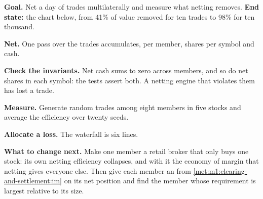 \begin{tutorial}
\textbf{Goal.} Net a day of trades multilaterally and measure what netting
removes. \textbf{End state:} the chart below, from 41\% of value removed for
ten trades to 98\% for ten thousand.
\begin{tutsteps}
\item \textbf{Net.} One pass over the trades accumulates, per member, shares
per symbol and cash.
\label{lst:m1:clearing-and-settlement:net}
\item \textbf{Check the invariants.} Net cash sums to zero across members,
and so do net shares in each symbol: the tests assert both. A netting engine
that violates them has lost a trade.
\item \textbf{Measure.} Generate random trades among eight members in five
stocks and average the efficiency over twenty seeds.
\item \textbf{Allocate a loss.} The waterfall is six lines.
\label{lst:m1:clearing-and-settlement:wf}
\end{tutsteps}
\textbf{What to change next.} Make one member a retail broker that only buys
one stock: its own netting efficiency collapses, and with it the economy of
margin that netting gives everyone else. Then give each member an  from \cref{met:m1:clearing-and-settlement:im} on its net position and
find the member whose requirement is largest relative to its size.
\end{tutorial}

\begin{omfigure}

\end{omfigure}


